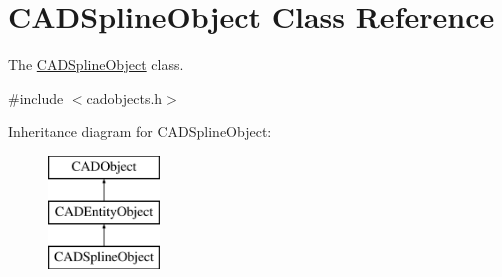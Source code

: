 \hypertarget{class_c_a_d_spline_object}{}\section{C\+A\+D\+Spline\+Object Class Reference}
\label{class_c_a_d_spline_object}


The \hyperlink{class_c_a_d_spline_object}{C\+A\+D\+Spline\+Object} class.  




{\ttfamily \#include $<$cadobjects.\+h$>$}

Inheritance diagram for C\+A\+D\+Spline\+Object\+:\begin{figure}[H]
\begin{center}
\leavevmode
\includegraphics[height=3.000000cm]{class_c_a_d_spline_object}
\end{center}
\end{figure}
